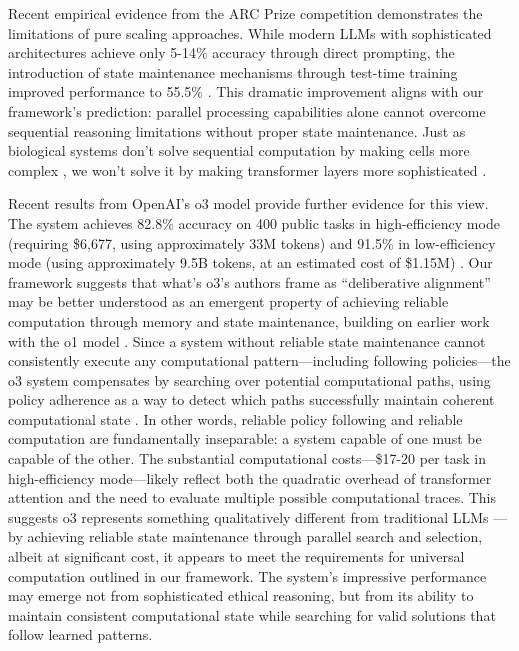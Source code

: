 \documentclass[12pt]{article}
\begin{document}
Recent empirical evidence from the ARC Prize competition demonstrates the limitations of pure scaling approaches.
While modern LLMs with sophisticated architectures achieve only 5-14\% accuracy through direct prompting, the introduction of state maintenance mechanisms through test-time training improved performance to 55.5\% \cite{chollet2024arc}.
This dramatic improvement aligns with our framework's prediction: parallel processing capabilities alone cannot overcome sequential reasoning limitations without proper state maintenance.
Just as biological systems don't solve sequential computation by making cells more complex \cite{wang2023parallel}, we won't solve it by making transformer layers more sophisticated \cite{zhao2024epha}.

Recent results from OpenAI's o3 model provide further evidence for this view.
The system achieves 82.8\% accuracy on 400 public tasks in high-efficiency mode (requiring \$6,677, using approximately 33M tokens) and 91.5\% in low-efficiency mode (using approximately 9.5B tokens, at an estimated cost of \$1.15M) \cite{chollet2024o3}.
Our framework suggests that what's o3's authors frame as ``deliberative alignment'' \cite{openai2024o3blog,guan2024deliberative} may be better understood as an emergent property of achieving reliable computation through memory and state maintenance, building on earlier work with the o1 model \cite{openai2024learning}.
Since a system without reliable state maintenance cannot consistently execute any computational pattern---including following policies---the o3 system compensates by searching over potential computational paths, using policy adherence as a way to detect which paths successfully maintain coherent computational state \cite{chollet2024o3, openai2024learning}.
In other words, reliable policy following and reliable computation are fundamentally inseparable: a system capable of one must be capable of the other.
The substantial computational costs---\$17-20 per task in high-efficiency mode---likely reflect both the quadratic overhead of transformer attention and the need to evaluate multiple possible computational traces.
This suggests o3 represents something qualitatively different from traditional LLMs \cite{willison2024o3}---by achieving reliable state maintenance through parallel search and selection, albeit at significant cost, it appears to meet the requirements for universal computation outlined in our framework.
The system's impressive performance may emerge not from sophisticated ethical reasoning, but from its ability to maintain consistent computational state while searching for valid solutions that follow learned patterns.
\end{document}
